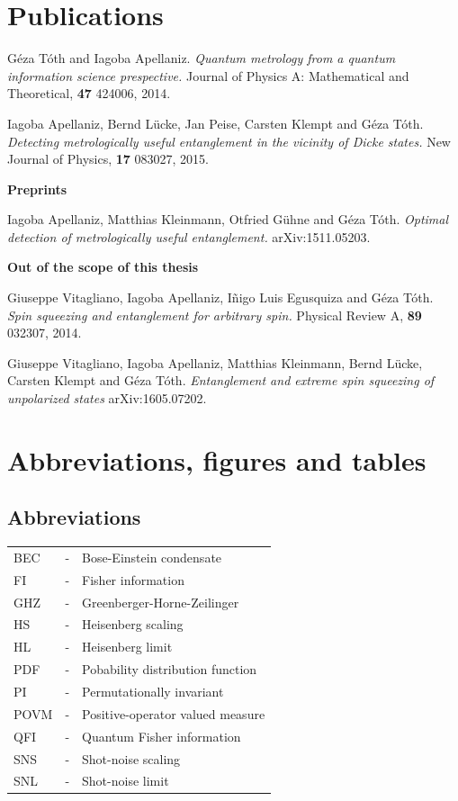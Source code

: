 \documentclass[12pt, letterpaper, twoside]{article}
\numberwithin{equation}{section}
\numberwithin{figure}{section}
\numberwithin{table}{section}
\newcommand{\abbrln}[2]{#1 & - & #2 \\}
\begin{document}
\section*{Publications}
{\setlength{\parindent}{0cm}
G\'eza T\'oth and Iagoba Apellaniz.
\textit{Quantum metrology from a quantum information science prespective.}
Journal of Physics A: Mathematical and Theoretical, \textbf{47} 424006, 2014.
\vspace{6pt}

Iagoba Apellaniz, Bernd L\"ucke, Jan Peise, Carsten Klempt and G\'eza T\'oth.
\textit{Detecting metrologically useful entanglement in the vicinity of Dicke states.}
New Journal of Physics, \textbf{17} 083027, 2015.
\vspace{6pt}

{\large\bf Preprints}

Iagoba Apellaniz, Matthias Kleinmann, Otfried G\"uhne and G\'eza T\'oth.
\textit{Optimal detection of metrologically useful entanglement.}
arXiv:1511.05203.
\vspace{6pt}

{\large\bf Out of the scope of this thesis}

Giuseppe Vitagliano, Iagoba Apellaniz, I\~nigo Luis Egusquiza and G\'eza T\'oth.
\textit{Spin squeezing and entanglement for arbitrary spin.}
Physical Review A, \textbf{89} 032307, 2014.
\vspace{6pt}

Giuseppe Vitagliano, Iagoba Apellaniz, Matthias Kleinmann, Bernd L\"ucke, Carsten Klempt and G\'eza T\'oth.
\textit{Entanglement and extreme spin squeezing of unpolarized states} arXiv:1605.07202.
}


\vspace*{100pt}
\tableofcontents

\section*{Abbreviations, figures and tables}
\fancyfoot[LE,RO]{\thepage}
\subsection*{Abbreviations}
\hspace{7pt}
\begin{tabular}{l c l}
  \abbrln{BEC}{Bose-Einstein condensate}
  \abbrln{FI}{Fisher information}
  \abbrln{GHZ}{Greenberger-Horne-Zeilinger}
  \abbrln{HS}{Heisenberg scaling}
  \abbrln{HL}{Heisenberg limit}
  \abbrln{PDF}{Pobability distribution function}
  \abbrln{PI}{Permutationally invariant}
  \abbrln{POVM}{Positive-operator valued measure}
  \abbrln{QFI}{Quantum Fisher information}
  \abbrln{SNS}{Shot-noise scaling}
  \abbrln{SNL}{Shot-noise limit}
\end{tabular}
\end{document}
